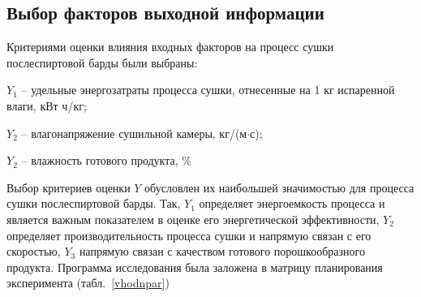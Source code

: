\subsection{Выбор факторов выходной информации}

Критериями оценки влияния входных факторов на процесс сушки послеспиртовой барды были
выбраны:

\begin{description}
\item $Y_1$ -- удельные энергозатраты процесса сушки, отнесенные на 1 кг испаренной влаги,
    {кВт ч}/{кг};
\item $Y_2$ -- влагонапряжение сушильной камеры, кг/(м$\cdot$с);

\item $Y_2$ -- влажность готового продукта, \%
\end{description}

Выбор критериев оценки $Y$ обусловлен их наибольшей значимостью для процесса сушки
послеспиртовой барды.
Так, $Y_1$ определяет энергоемкость процесса и является важным показателем в оценке его
энергетической эффективности, $Y_2$ определяет производительность процесса сушки и напрямую
связан с его скоростью,  $Y_3$ напрямую связан
с качеством готового порошкообразного продукта.
Программа исследования была  заложена в матрицу планирования эксперимента
(табл.~\ref{vhodnpar})


